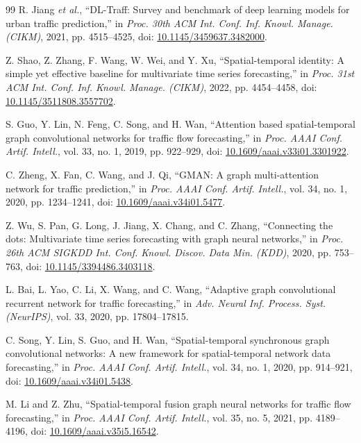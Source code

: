 \begin{thebibliography}{99}
R. Jiang \emph{et al.}, ``DL-Traff: Survey and benchmark of deep learning models for urban traffic prediction,'' in \emph{Proc. 30th ACM Int. Conf. Inf. Knowl. Manage. (CIKM)}, 2021, pp. 4515--4525, doi: \href{https://doi.org/10.1145/3459637.3482000}{10.1145/3459637.3482000}.

Z. Shao, Z. Zhang, F. Wang, W. Wei, and Y. Xu, ``Spatial-temporal identity: A simple yet effective baseline for multivariate time series forecasting,'' in \emph{Proc. 31st ACM Int. Conf. Inf. Knowl. Manage. (CIKM)}, 2022, pp. 4454--4458, doi: \href{https://doi.org/10.1145/3511808.3557702}{10.1145/3511808.3557702}.

S. Guo, Y. Lin, N. Feng, C. Song, and H. Wan, ``Attention based spatial-temporal graph convolutional networks for traffic flow forecasting,'' in \emph{Proc. AAAI Conf. Artif. Intell.}, vol. 33, no. 1, 2019, pp. 922--929, doi: \href{https://doi.org/10.1609/aaai.v33i01.3301922}{10.1609/aaai.v33i01.3301922}.

C. Zheng, X. Fan, C. Wang, and J. Qi, ``GMAN: A graph multi-attention network for traffic prediction,'' in \emph{Proc. AAAI Conf. Artif. Intell.}, vol. 34, no. 1, 2020, pp. 1234--1241, doi: \href{https://doi.org/10.1609/aaai.v34i01.5477}{10.1609/aaai.v34i01.5477}.

Z. Wu, S. Pan, G. Long, J. Jiang, X. Chang, and C. Zhang, ``Connecting the dots: Multivariate time series forecasting with graph neural networks,'' in \emph{Proc. 26th ACM SIGKDD Int. Conf. Knowl. Discov. Data Min. (KDD)}, 2020, pp. 753--763, doi: \href{https://doi.org/10.1145/3394486.3403118}{10.1145/3394486.3403118}.

L. Bai, L. Yao, C. Li, X. Wang, and C. Wang, ``Adaptive graph convolutional recurrent network for traffic forecasting,'' in \emph{Adv. Neural Inf. Process. Syst. (NeurIPS)}, vol. 33, 2020, pp. 17804--17815.

C. Song, Y. Lin, S. Guo, and H. Wan, ``Spatial-temporal synchronous graph convolutional networks: A new framework for spatial-temporal network data forecasting,'' in \emph{Proc. AAAI Conf. Artif. Intell.}, vol. 34, no. 1, 2020, pp. 914--921, doi: \href{https://doi.org/10.1609/aaai.v34i01.5438}{10.1609/aaai.v34i01.5438}.

M. Li and Z. Zhu, ``Spatial-temporal fusion graph neural networks for traffic flow forecasting,'' in \emph{Proc. AAAI Conf. Artif. Intell.}, vol. 35, no. 5, 2021, pp. 4189--4196, doi: \href{https://doi.org/10.1609/aaai.v35i5.16542}{10.1609/aaai.v35i5.16542}.


\end{thebibliography}
